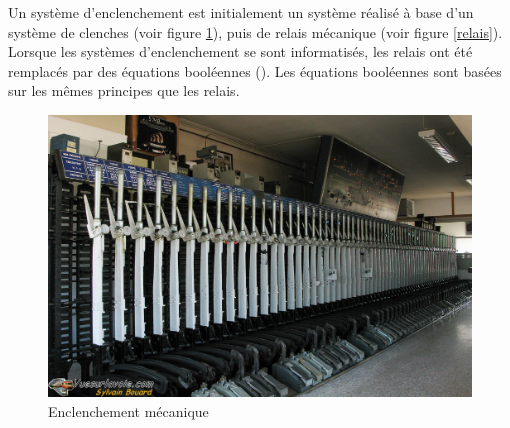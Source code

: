 Un système d'enclenchement est initialement un système réalisé à base
d'un système de clenches (voir figure \ref{clenche}), puis de relais
mécanique (voir figure \ref{relais}). Lorsque les systèmes
d'enclenchement se sont 
informatisés, les relais ont été remplacés par des équations
booléennes (\cite{nyct2016}). Les équations booléennes sont basées sur
les mêmes principes que les relais.

\begin{figure}[ht]
    \begin{minipage}[c]{.46\linewidth}
        \centering
        \includegraphics[scale=0.3]{enclenchement_mecanique.jpg}
        \caption{Enclenchement mécanique}
        \label{clenche}
    \end{minipage}
    \hfill%
    \begin{minipage}[c]{.46\linewidth}
        \centering

\end{minipage}
\end{figure}
